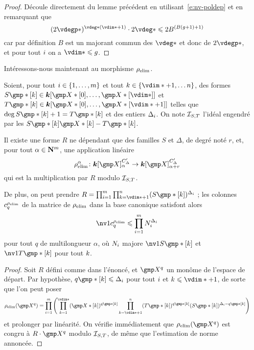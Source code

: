 \begin{proof}
  Découle directement du lemme précédent en utilisant~\eqref{e:nv-poldep} et
  en remarquant que
  \begin{equation}
    ( 2 \vdegp* )^{\vdeg* (\vdim* + 1)} \cdot 2 \vdeg*
    \le
    2 B^{(B(\genre+1) + 1)}
  \end{equation}
  car par définition \( B \) est un majorant commun des \( \vdeg* \) et donc
  de \( 2\vdegp* \), et pour tout \( i \) on a \( \vdim* \le \genre \).
\end{proof}

Intéressons-nous maintenant au morphisme \( \rho\sb{\mathrm{elim}} \).

\begin{lem}
  Soient, pour tout \( i \in \{ 1, \dots, m \} \) et tout \( \ind \in
  \{ \vdim* + 1, \dots \dimp \} \), des formes
  \( S\mexp*[\ind] \in \cdn [ \vmp*[0], \dots, \vmp*[\vdim*] ] \) et
  \( T\mexp*[\ind] \in \cdn [ \vmp*[0], \dots, \vmp*[\vdim*+1] ] \)
  telles que \( \deg S\mexp*[\ind] + 1 = T\mexp*[\ind] \) et des entiers
  \( \Delta_i \). On note \( \mathcal I_{S, T} \) l'idéal engendré par les
  \( S\mexp*[\ind] \vmp*[\ind] - T\mexp*[\ind] \).

  Il existe une forme \( R \) ne dépendant que des familles \( S \) et \(
    \Delta \), de degré noté \( r \), et, pour tout \( \alpha \in {\mathbf{N}}^m \),
  une application linéaire
  \begin{equation}
    \relim^\alpha \colon
    \cdn [\vmp]_ {\alpha}^{C'_\Delta}
    \to
    \cdn [\vmp]_ {\alpha+r}^{C'_\Delta}
  \end{equation}
  qui est la multiplication par \( R \) modulo \( \mathcal I_{S, T} \).

  De plus, on peut prendre
  \( R = \prod\fctrange \prod_{\ind = \vdim*+1}^{\dimp}
    ( S\mexp*[\ind] )^{\Delta_\fct} \) ; les colonnes \( c_q^{\rho\sb{\mathrm{elim}}} \) de la
  matrice de \( \rho\sb{\mathrm{elim}} \) dans la base canonique satisfont alors
  \begin{equation}
    \nv1{ c_q^{\relim} }
    \le
    \prod\fctrange N_\fct^{\Delta_\fct}
  \end{equation}
  pour tout \( q \) de multilongueur \( \alpha \), où \( N_i \) majore
  \( \nv1{ S\mexp*[\ind] } \) et \( \nv1{ T\mexp*[\ind] } \) pour tout
  \( k \).
\end{lem}

\begin{proof}
  Soit \( R \) défini comme dans l'énoncé, et \( \vmp^q \) un monôme de
  l'espace de départ. Par hypothèse, \( q\mexp*[\ind] \le \Delta_\fct \) pour
  tout \( i \) et \( \ind \le \vdim* + 1 \), de sorte que l'on peut poser
  \begin{equation}
    \relim( \vmp^q )
    =
    \prod\fctrange \left(
    \prod_{\ind=1}^{\vdim*}
    (\vmp*[\ind])^{q\mexp*[\ind]}
    \prod_{\ind=\vdim*+1}^\dimp
    (T\mexp*[\ind])^{q\mexp*[\ind]}
    (S\mexp*[\ind])^{\Delta_\fct - q\mexp*[\ind]}
    \right)
  \end{equation}
  et prolonger par linéarité. On vérifie immédiatement que \( \relim(\vmp^q)
  \) est congru à \( R \cdot \vmp^q \) modulo \( \mathcal I_{S, T} \), de même
  que l'estimation de norme annoncée.
\end{proof}

